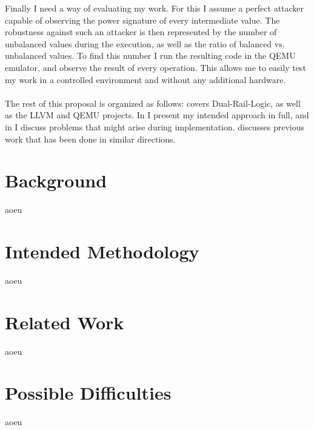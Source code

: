 \documentclass{article}
\newcommand{\qemu}{QEMU}
\newcommand{\dual}{Dual-Rail-Logic}
\newcommand{\llvm}{LLVM}
\newcommand{\exposee}{proposal}
\begin{document}
Finally I need a way of evaluating my work.
For this I assume a perfect attacker capable of observing the power signature of every intermediate value.
The robustness against such an attacker is then represented by the number of unbalanced values during the execution, as well as the ratio of balanced vs. unbalanced values.
To find this number I run the resulting code in the \qemu{} emulator, and observe the result of every operation.
This allows me to easily test my work in a controlled environment and without any additional hardware.
\\
\\
The rest of this \exposee{} is organized as follows:
 covers \dual{}, as well as the \llvm{} and \qemu{} projects.
In  I present my intended approach in full, and in  I discuss problems that might arise during implementation.
 discusses previous work that has been done in similar directions.

\section{Background}
\label{sec:background}
aoeu

\section{Intended Methodology}
\label{sec:methodology}
aoeu

\section{Related Work}
\label{sec:related-work}
aoeu

\section{Possible Difficulties}
\label{sec:difficulties}
aoeu




\end{document}
